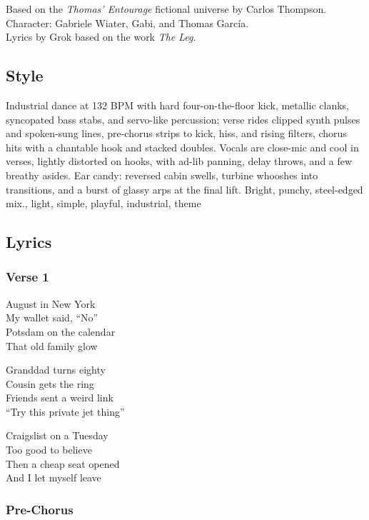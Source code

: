 Based on the \emph{Thomas' Entourage} fictional universe by Carlos
Thompson.\\
Character: Gabriele Wiater, Gabi, and Thomas García.\\
Lyrics by Grok based on the work \emph{The Leg}.

\subsection{Style}\label{style-28}

Industrial dance at 132 BPM with hard four-on-the-floor kick, metallic
clanks, syncopated bass stabs, and servo-like percussion; verse rides
clipped synth pulses and spoken-sung lines, pre-chorus strips to kick,
hiss, and rising filters, chorus hits with a chantable hook and stacked
doubles. Vocals are close-mic and cool in verses, lightly distorted on
hooks, with ad-lib panning, delay throws, and a few breathy asides. Ear
candy: reversed cabin swells, turbine whooshes into transitions, and a
burst of glassy arps at the final lift. Bright, punchy, steel-edged
mix., light, simple, playful, industrial, theme

\subsection{Lyrics}\label{lyrics-28}

\subsubsection{Verse 1}\label{verse-1-24}

August in New York\\
My wallet said, ``No''\\
Potsdam on the calendar\\
That old family glow

Granddad turns eighty\\
Cousin gets the ring\\
Friends sent a weird link\\
``Try this private jet thing''

Craigslist on a Tuesday\\
Too good to believe\\
Then a cheap seat opened\\
And I let myself leave

\subsubsection{Pre-Chorus}\label{pre-chorus-39}

